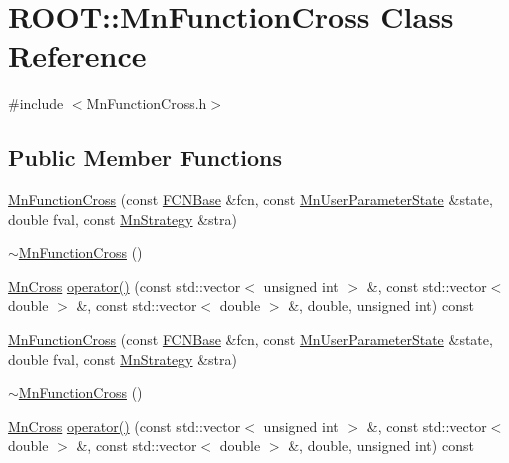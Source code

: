 \hypertarget{classROOT_1_1Minuit2_1_1MnFunctionCross}{}\section{R\+O\+OT\+:\+:Mn\+Function\+Cross Class Reference}
\label{classROOT_1_1Minuit2_1_1MnFunctionCross}


{\ttfamily \#include $<$Mn\+Function\+Cross.\+h$>$}

\subsection*{Public Member Functions}
\begin{DoxyCompactItemize}
\item 
\mbox{\hyperlink{classROOT_1_1Minuit2_1_1MnFunctionCross_a553cffc846a7ffc94ef777c660862f80}{Mn\+Function\+Cross}} (const \mbox{\hyperlink{classROOT_1_1Minuit2_1_1FCNBase}{F\+C\+N\+Base}} \&fcn, const \mbox{\hyperlink{classROOT_1_1Minuit2_1_1MnUserParameterState}{Mn\+User\+Parameter\+State}} \&state, double fval, const \mbox{\hyperlink{classROOT_1_1Minuit2_1_1MnStrategy}{Mn\+Strategy}} \&stra)
\item 
\mbox{\hyperlink{classROOT_1_1Minuit2_1_1MnFunctionCross_a6eddadf7793152d1c7a4604b2f374035}{$\sim$\+Mn\+Function\+Cross}} ()
\item 
\mbox{\hyperlink{classROOT_1_1Minuit2_1_1MnCross}{Mn\+Cross}} \mbox{\hyperlink{classROOT_1_1Minuit2_1_1MnFunctionCross_ace9b7e1472f82cb23525365e5f061477}{operator()}} (const std\+::vector$<$ unsigned int $>$ \&, const std\+::vector$<$ double $>$ \&, const std\+::vector$<$ double $>$ \&, double, unsigned int) const
\item 
\mbox{\hyperlink{classROOT_1_1Minuit2_1_1MnFunctionCross_a553cffc846a7ffc94ef777c660862f80}{Mn\+Function\+Cross}} (const \mbox{\hyperlink{classROOT_1_1Minuit2_1_1FCNBase}{F\+C\+N\+Base}} \&fcn, const \mbox{\hyperlink{classROOT_1_1Minuit2_1_1MnUserParameterState}{Mn\+User\+Parameter\+State}} \&state, double fval, const \mbox{\hyperlink{classROOT_1_1Minuit2_1_1MnStrategy}{Mn\+Strategy}} \&stra)
\item 
\mbox{\hyperlink{classROOT_1_1Minuit2_1_1MnFunctionCross_a6eddadf7793152d1c7a4604b2f374035}{$\sim$\+Mn\+Function\+Cross}} ()
\item 
\mbox{\hyperlink{classROOT_1_1Minuit2_1_1MnCross}{Mn\+Cross}} \mbox{\hyperlink{classROOT_1_1Minuit2_1_1MnFunctionCross_ace9b7e1472f82cb23525365e5f061477}{operator()}} (const std\+::vector$<$ unsigned int $>$ \&, const std\+::vector$<$ double $>$ \&, const std\+::vector$<$ double $>$ \&, double, unsigned int) const
\end{DoxyCompactItemize}


